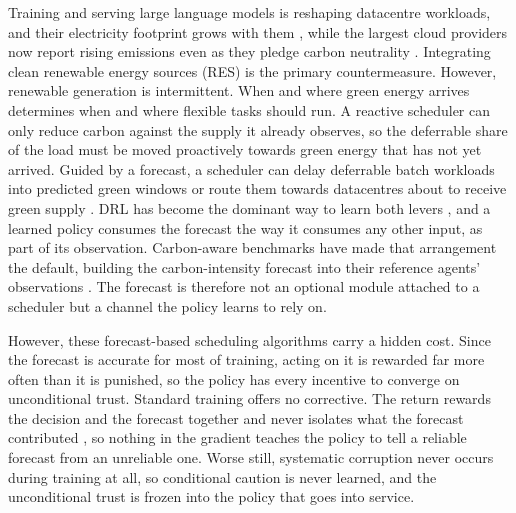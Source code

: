 \documentclass{article} %
\begin{document}
Training and serving large language models is reshaping datacentre workloads, and their electricity footprint grows with them \citep{jonesHowStopData2018}, while the largest cloud providers now report rising emissions even as they pledge carbon neutrality \citep{google2025EnvironmentalReport2025, microsoft2024EnvironmentalSustainability2024}. Integrating clean renewable energy sources (RES) is the primary countermeasure. However, renewable generation is intermittent. When and where green energy arrives determines when and where flexible tasks should run. A reactive scheduler can only reduce carbon against the supply it already observes, so the deferrable share of the load must be moved proactively towards green energy that has not yet arrived. Guided by a forecast, a scheduler can delay deferrable batch workloads into predicted green windows \citep{wiesnerLetsWaitAwhile2021} or route them towards datacentres about to receive green supply \citep{xuRenewableEnergyawareBig2018, zhangSustainableAIGCWorkload2023}. DRL has become the dominant way to learn both levers \citep{maoResourceManagementDeep2016, zhangGreenDRLManagingGreen2022}, and a learned policy consumes the forecast the way it consumes any other input, as part of its observation. Carbon-aware benchmarks have made that arrangement the default, building the carbon-intensity forecast into their reference agents' observations \citep{naug2024sustaindc, venkataswamyRARERenewableEnergy2022}. The forecast is therefore not an optional module attached to a scheduler but a channel the policy learns to rely on.

However, these forecast-based scheduling algorithms carry a hidden cost. Since the forecast is accurate for most of training, acting on it is rewarded far more often than it is punished, so the policy has every incentive to converge on unconditional trust. Standard training offers no corrective. The return rewards the decision and the forecast together and never isolates what the forecast contributed \citep{dietterich2018discovering}, so nothing in the gradient teaches the policy to tell a reliable forecast from an unreliable one. Worse still, systematic corruption never occurs during training at all, so conditional caution is never learned, and the unconditional trust is frozen into the policy that goes into service.
\end{document}
